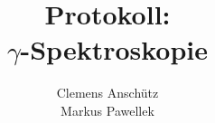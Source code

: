 

\title{Protokoll: \\ $\gamma$-Spektroskopie}
\author{Clemens Anschütz \\ Markus Pawellek}
\newcommand{\email}{markuspawellek@gmail.com}

\usepackage{skull}
\usepackage[font=footnotesize]{subcaption}
\usepackage{placeins}


	
	\articletitle
	\tableofcontents
	\newpage
	\thispagestyle{empty}
	\null

	\newpage
	
	\newpage
	
	\newpage
	
	\FloatBarrier
	\null
	\newpage
	
	\newpage
	
	\newpage
	\appendix
	

